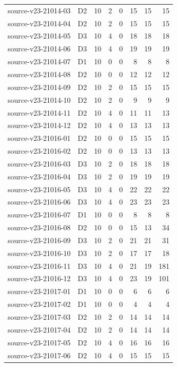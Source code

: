 \begin{longtable}{p{}lrrrrrr}
source-v23-21014-03 & D2 & 10 & 2 & 0 & 15 & 15 & 15\\
source-v23-21014-04 & D2 & 10 & 2 & 0 & 15 & 15 & 15\\
source-v23-21014-05 & D3 & 10 & 4 & 0 & 18 & 18 & 18\\
source-v23-21014-06 & D3 & 10 & 4 & 0 & 19 & 19 & 19\\
source-v23-21014-07 & D1 & 10 & 0 & 0 & 8 & 8 & 8\\
source-v23-21014-08 & D2 & 10 & 0 & 0 & 12 & 12 & 12\\
source-v23-21014-09 & D2 & 10 & 2 & 0 & 15 & 15 & 15\\
source-v23-21014-10 & D2 & 10 & 2 & 0 & 9 & 9 & 9\\
source-v23-21014-11 & D2 & 10 & 4 & 0 & 11 & 11 & 13\\
source-v23-21014-12 & D2 & 10 & 4 & 0 & 13 & 13 & 13\\
source-v23-21016-01 & D2 & 10 & 0 & 0 & 15 & 15 & 15\\
source-v23-21016-02 & D2 & 10 & 0 & 0 & 13 & 13 & 13\\
source-v23-21016-03 & D3 & 10 & 2 & 0 & 18 & 18 & 18\\
source-v23-21016-04 & D3 & 10 & 2 & 0 & 19 & 19 & 19\\
source-v23-21016-05 & D3 & 10 & 4 & 0 & 22 & 22 & 22\\
source-v23-21016-06 & D3 & 10 & 4 & 0 & 23 & 23 & 23\\
source-v23-21016-07 & D1 & 10 & 0 & 0 & 8 & 8 & 8\\
source-v23-21016-08 & D2 & 10 & 0 & 0 & 15 & 13 & 34\\
source-v23-21016-09 & D3 & 10 & 2 & 0 & 21 & 21 & 31\\
source-v23-21016-10 & D3 & 10 & 2 & 0 & 17 & 17 & 18\\
source-v23-21016-11 & D3 & 10 & 4 & 0 & 21 & 19 & 181\\
source-v23-21016-12 & D3 & 10 & 4 & 0 & 23 & 19 & 101\\
source-v23-21017-01 & D1 & 10 & 0 & 0 & 6 & 6 & 6\\
source-v23-21017-02 & D1 & 10 & 0 & 0 & 4 & 4 & 4\\
source-v23-21017-03 & D2 & 10 & 2 & 0 & 14 & 14 & 14\\
source-v23-21017-04 & D2 & 10 & 2 & 0 & 14 & 14 & 14\\
source-v23-21017-05 & D2 & 10 & 4 & 0 & 16 & 16 & 16\\
source-v23-21017-06 & D2 & 10 & 4 & 0 & 15 & 15 & 15\\

\end{longtable}
